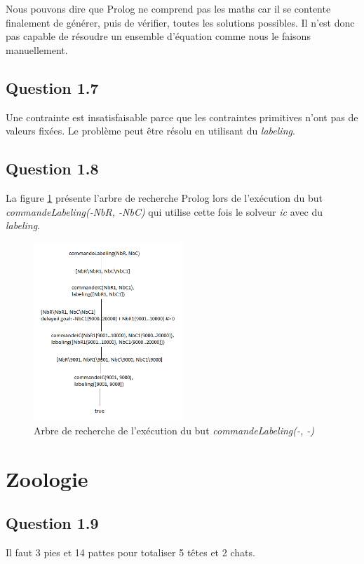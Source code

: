 \documentclass[a4paper,12pt]{article}
\begin{document}
Nous pouvons dire que Prolog ne comprend pas les maths car il se contente finalement de générer, puis de vérifier, toutes les solutions possibles.
Il n'est donc pas capable de résoudre un ensemble d'équation comme nous le faisons manuellement.

\subsection*{Question 1.7}
Une contrainte est insatisfaisable parce que les contraintes primitives n'ont pas de valeurs fixées.
Le problème peut être résolu en utilisant du \textit{labeling}.

\subsection*{Question 1.8}
La figure \ref{fig:searchtree-labeling} présente l'arbre de recherche Prolog lors de l'exécution du but \textit{commandeLabeling(-NbR, -NbC)} qui utilise cette fois le solveur \textit{ic} avec du \textit{labeling}.
\begin{figure}
  \center
  \includegraphics[width=0.5\textwidth]{searchtree-labeling.png}
  \caption{Arbre de recherche de l'exécution du but \textit{commandeLabeling(-, -)}}
  \label{fig:searchtree-labeling}
\end{figure}


\section{Zoologie}


\vspace{2cm}

\subsection*{Question 1.9}
Il faut 3 pies et 14 pattes pour totaliser 5 têtes et 2 chats.
\end{document}
